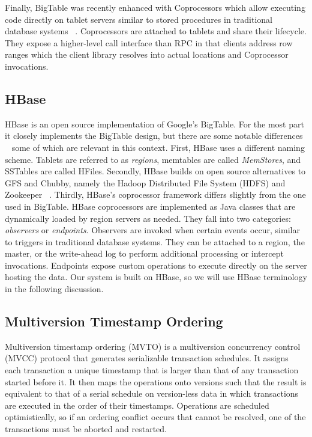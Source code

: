 \documentclass[10pt,final,journal]{IEEEtran}
\begin{document}
Finally, BigTable was recently enhanced with Coprocessors which allow executing code directly on tablet servers similar to stored procedures in traditional database systems ~\cite{Dean:2009}. Coprocessors are attached to tablets and share their lifecycle. They expose a higher-level call interface than RPC in that clients address row ranges which the client library resolves into actual locations and Coprocessor invocations.

\subsection{HBase}
HBase is an open source implementation of Google's BigTable. For the most part it closely implements the BigTable design, but there are some notable differences ~\cite{George:2011} some of which are relevant in this context. First, HBase uses a different naming scheme. Tablets are referred to as \emph{regions}, memtables are called \emph{MemStores}, and SSTables are called HFiles. Secondly, HBase builds on open source alternatives to GFS and Chubby, namely the Hadoop Distributed File System (HDFS) and Zookeeper ~\cite{Hunt:2010:ZWC:1855840.1855851}.
Thirdly, HBase's coprocessor framework differs slightly from the one used in BigTable. HBase coprocessors are implemented as Java classes that are dynamically loaded by region servers as needed. They fall into two categories: \emph{observers} or \emph{endpoints}. Observers are invoked when certain events occur, similar to triggers in traditional database systems. They can be attached to a region, the master, or the write-ahead log to perform additional processing or intercept invocations. Endpoints expose custom operations to execute directly on the server hosting the data.
Our system is built on HBase, so we will use HBase terminology in the following discussion.

\subsection{Multiversion Timestamp Ordering}
Multiversion timestamp ordering (MVTO) is a multiversion concurrency control (MVCC) protocol that generates serializable transaction schedules. It assigns each transaction a unique timestamp that is larger than that of any transaction started before it. It then maps the operations onto versions such that the result is equivalent to that of a serial schedule on version-less data in which transactions are executed in the order of their timestamps. Operations are scheduled optimistically, so if an ordering conflict occurs that cannot be resolved, one of the transactions must be aborted and restarted.
\end{document}

